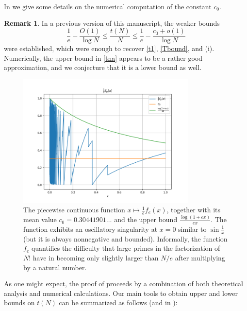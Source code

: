 \documentclass[12pt,a4paper,reqno]{amsart}
\numberwithin{equation}{section}
\theoremstyle{plain}
\theoremstyle{definition}
\newtheorem{remark}[theorem]{Remark}
\begin{document}
In  we give some details on the numerical computation of the constant $c_0$.

\begin{remark}\label{old} In a previous version \cite{tao} of this manuscript, the weaker bounds
  $$ \frac{1}{e} - \frac{O(1)}{\log N} \leq \frac{t(N)}{N} \leq \frac{1}{e} - \frac{c_0+o(1)}{\log N}$$
were established, which were enough to recover \eqref{t1}, \eqref{Tbound}, and (i). Numerically, the upper bound in \eqref{tna} appears to be a rather good approximation, and we conjecture that it is a lower bound as well.
\end{remark}  

\begin{figure}
  \centering
  \includegraphics[width=0.8\textwidth]{integ.png}
  \caption{The piecewise continuous function $x\mapsto \frac{1}{e} f_e(x)$, together with its mean value $c_0 = 0.30441901\dots$ and the upper bound $\frac{\log(1+ex)}{ex}$.  The function exhibits an oscillatory singularity at $x=0$ similar to $\sin \frac{1}{x}$ (but it is always nonnegative and bounded). Informally, the function $f_e$ quantifies the difficulty that large primes in the factorization of $N!$ have in becoming only slightly larger than $N/e$ after multiplying by a natural number.}\label{fig-mean}
\end{figure}

As one might expect, the proof of  proceeds by a combination of both theoretical analysis and numerical calculations.  Our main tools to obtain upper and lower bounds on $t(N)$ can be summarized as follows (and in ):
\end{document}
